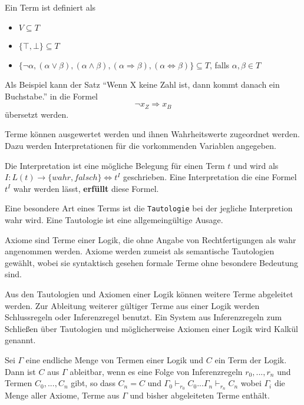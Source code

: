\begin{defi}
  Ein Term ist definiert als
  \begin{itemize}
  \item $V\subseteq T$
  \item $\{\top,\bot\}\subseteq T$
  \item $\{\neg\alpha,(\alpha\vee\beta),(\alpha\wedge\beta),(\alpha\Rightarrow\beta),(\alpha\Leftrightarrow\beta)\}\subseteq T$, falls $\alpha,\beta\in T$
  \end{itemize}
\end{defi}

Als Beispiel kann der Satz "`Wenn X keine Zahl ist, dann kommt danach ein
Buchstabe."' in die Formel
\[
  \neg x_{Z} \Rightarrow x_{B}
\]
übersetzt werden.

Terme können ausgewertet werden und ihnen Wahrheitswerte zugeordnet werden.
Dazu werden Interpretationen für die vorkommenden Variablen angegeben.

\begin{defi}
  Die Interpretation ist eine mögliche Belegung für einen Term $t$ und
  wird als $I:L(t)\rightarrow \{wahr,falsch\} \Leftrightarrow t^I$ geschrieben.
  Eine Interpretation die eine Formel $t^I$ wahr werden lässt, \textbf{erfüllt}
  diese Formel.
\end{defi}

Eine besondere Art eines Terms ist die \texttt{Tautologie} bei der jegliche
Interpretion wahr wird. Eine Tautologie ist eine allgemeingültige Ausage.

\begin{defi}
  Axiome sind Terme einer Logik, die ohne Angabe von Rechtfertigungen als wahr angenommen
  werden. Axiome werden zumeist als semantische Tautologien gewählt, wobei sie
  syntaktisch gesehen formale Terme ohne besondere Bedeutung sind.
\end{defi}

Aus den Tautologien und Axiomen einer Logik können weitere Terme abgeleitet
werden. Zur Ableitung weiterer gültiger Terme aus einer Logik werden
Schlussregeln oder Inferenzregel benutzt. Ein System aus Inferenzregeln zum
Schließen über Tautologien und möglicherweise Axiomen einer Logik wird Kalkül genannt.

\begin{defi}
  Sei $\Gamma$ eine endliche Menge von Termen einer Logik und $C$ ein Term der Logik.
  Dann ist $C$ aus $\Gamma$ ableitbar, wenn es eine Folge von Inferenzregeln
  $r_0,...,r_n$ und Termen $C_0,...,C_n$ gibt, so dass $C_n = C$ und
  $\Gamma_0\vdash_{r_0}C_0 ... \Gamma_n\vdash_{r_n}C_n$ wobei $\Gamma_i$ die Menge aller Axiome, Terme
  aus $\Gamma$ und bisher abgeleiteten Terme enthält.
\end{defi}

